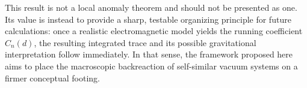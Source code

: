 \documentclass[12pt,letterpaper]{article}
\begin{document}
This result is not a local anomaly theorem and should not be presented as one.
Its value is instead to provide a sharp, testable organizing principle for future calculations: once a realistic electromagnetic model yields the running coefficient $C_n(d)$, the resulting integrated trace and its possible gravitational interpretation follow immediately.
In that sense, the framework proposed here aims to place the macroscopic backreaction of self-similar vacuum systems on a firmer conceptual footing.





\end{document}
